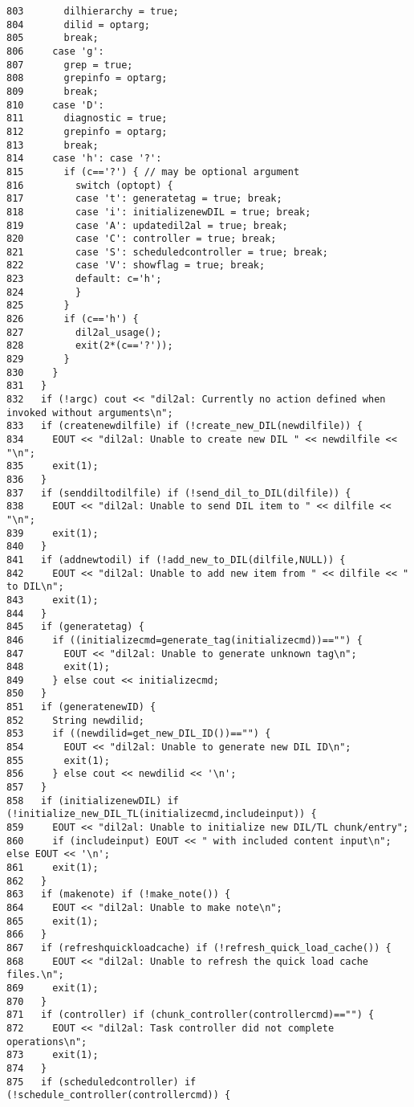 \begin{verbatim}
803       dilhierarchy = true;
804       dilid = optarg;
805       break;
806     case 'g':
807       grep = true;
808       grepinfo = optarg;
809       break;
810     case 'D':
811       diagnostic = true;
812       grepinfo = optarg;
813       break;
814     case 'h': case '?':
815       if (c=='?') { // may be optional argument
816         switch (optopt) {
817         case 't': generatetag = true; break;
818         case 'i': initializenewDIL = true; break;
819         case 'A': updatedil2al = true; break;
820         case 'C': controller = true; break;
821         case 'S': scheduledcontroller = true; break;
822         case 'V': showflag = true; break;
823         default: c='h';
824         }
825       }
826       if (c=='h') {
827         dil2al_usage();
828         exit(2*(c=='?'));
829       }
830     }
831   }
832   if (!argc) cout << "dil2al: Currently no action defined when invoked without arguments\n";
833   if (createnewdilfile) if (!create_new_DIL(newdilfile)) {
834     EOUT << "dil2al: Unable to create new DIL " << newdilfile << "\n";
835     exit(1);
836   }
837   if (senddiltodilfile) if (!send_dil_to_DIL(dilfile)) {
838     EOUT << "dil2al: Unable to send DIL item to " << dilfile << "\n";
839     exit(1);
840   }
841   if (addnewtodil) if (!add_new_to_DIL(dilfile,NULL)) {
842     EOUT << "dil2al: Unable to add new item from " << dilfile << " to DIL\n";
843     exit(1);
844   }
845   if (generatetag) {
846     if ((initializecmd=generate_tag(initializecmd))=="") {
847       EOUT << "dil2al: Unable to generate unknown tag\n";
848       exit(1);
849     } else cout << initializecmd;
850   }
851   if (generatenewID) {
852     String newdilid;
853     if ((newdilid=get_new_DIL_ID())=="") {
854       EOUT << "dil2al: Unable to generate new DIL ID\n";
855       exit(1);
856     } else cout << newdilid << '\n';
857   }
858   if (initializenewDIL) if (!initialize_new_DIL_TL(initializecmd,includeinput)) {
859     EOUT << "dil2al: Unable to initialize new DIL/TL chunk/entry";
860     if (includeinput) EOUT << " with included content input\n"; else EOUT << '\n';
861     exit(1);
862   }
863   if (makenote) if (!make_note()) {
864     EOUT << "dil2al: Unable to make note\n";
865     exit(1);
866   }
867   if (refreshquickloadcache) if (!refresh_quick_load_cache()) {
868     EOUT << "dil2al: Unable to refresh the quick load cache files.\n";
869     exit(1);
870   }
871   if (controller) if (chunk_controller(controllercmd)=="") {
872     EOUT << "dil2al: Task controller did not complete operations\n";
873     exit(1);
874   }
875   if (scheduledcontroller) if (!schedule_controller(controllercmd)) {

\end{verbatim}
